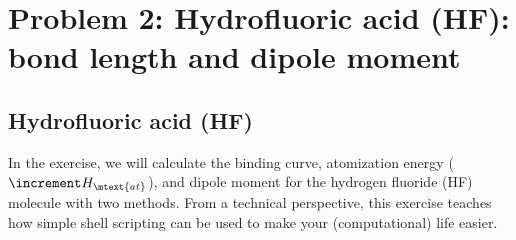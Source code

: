 \section{Problem 2: Hydrofluoric acid (HF): bond length and dipole moment} \label{sec:problemII}

\subsection*{Hydrofluoric acid (HF)}

In the exercise, we will calculate the binding curve, atomization energy (\( \increment H_\mtext{at} \)), and dipole moment for the hydrogen fluoride (HF) molecule with two methods. 
From a technical perspective, this exercise teaches how simple shell scripting can be used to make your (computational) life easier. 

%

